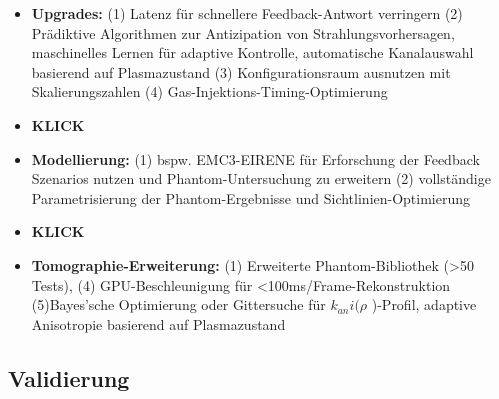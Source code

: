 \documentclass[11pt,a4paper]{article}
\begin{document}
\begin{itemize}
\item \textbf{Upgrades:} (1) Latenz für schnellere Feedback-Antwort verringern (2) Prädiktive Algorithmen zur Antizipation von Strahlungsvorhersagen, maschinelles Lernen für adaptive Kontrolle,  automatische Kanalauswahl basierend auf Plasmazustand (3) Konfigurationsraum ausnutzen mit Skalierungszahlen (4) Gas-Injektions-Timing-Optimierung
\item \textbf{KLICK}
\item \textbf{Modellierung:} (1) bspw. EMC3-EIRENE für Erforschung der Feedback Szenarios nutzen und Phantom-Untersuchung zu erweitern (2) vollständige Parametrisierung der Phantom-Ergebnisse und Sichtlinien-Optimierung
\item \textbf{KLICK}
\item \textbf{Tomographie-Erweiterung:} (1) Erweiterte Phantom-Bibliothek (>50 Tests), (4) GPU-Beschleunigung für <100ms/Frame-Rekonstruktion (5)Bayes'sche Optimierung oder Gittersuche für $ k_{an}i ( \rho $ )-Profil, adaptive Anisotropie basierend auf Plasmazustand
\end{itemize}

\subsection{Validierung}
\end{document}

